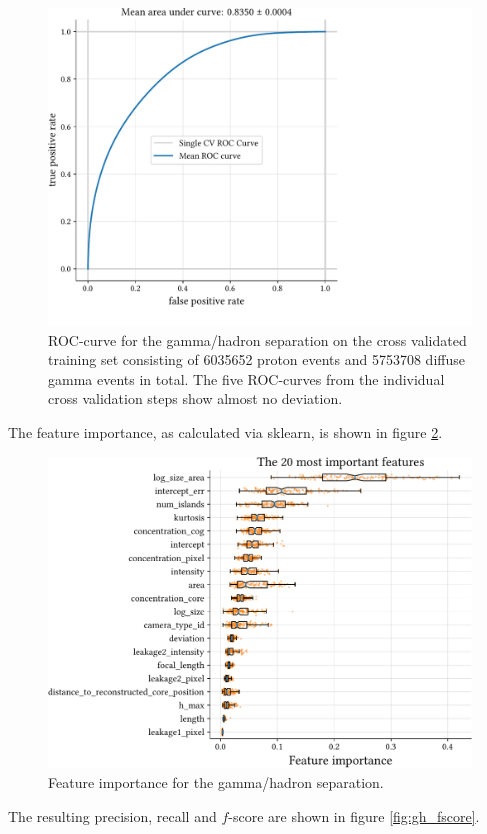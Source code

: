 \begin{figure}
    \centering
    \includegraphics[page=1, width=.8\textwidth]{../analysis/plots/cross_val_sep_perf_plot.pdf}
    \caption{ROC-curve for the gamma/hadron separation on the cross validated training set 
    consisting of \num{6035652} proton events and \num{5753708} diffuse gamma events in total.
    The five ROC-curves from the individual cross validation steps show almost no deviation.}
    \label{fig:gh_roc}
\end{figure}


The feature importance, as calculated via sklearn, is shown in figure \ref{fig:gh_features}.
\begin{figure}
    \centering
    \includegraphics[page=1, width=.8\textwidth]{../analysis/plots/separation_features.pdf}
    \caption{Feature importance for the gamma/hadron separation.}
    \label{fig:gh_features}
\end{figure}


The resulting precision, recall and $f$-score are shown in figure \ref{fig:gh_fscore}.

